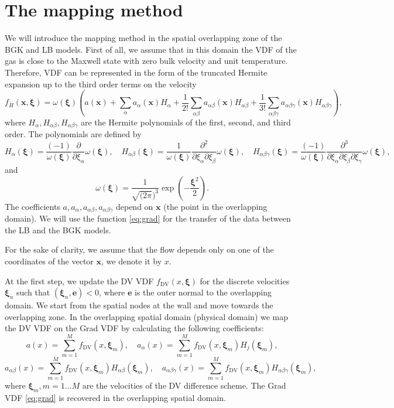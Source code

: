 \documentclass[]{elsarticle} %
\newcommand{\bxi}{\boldsymbol{\xi}}
\newcommand{\bx}{\boldsymbol{x}}
\newcommand{\DV}{\mathrm{DV}}
\newcommand{\ai}{a_{\alpha}}
\newcommand{\aij}{a_{\alpha\beta}}
\newcommand{\aijk}{a_{\alpha\beta\gamma}}
\newcommand{\Hi}{H_{\alpha}}
\newcommand{\Hij}{H_{\alpha\beta}}
\newcommand{\Hijk}{H_{\alpha\beta\gamma}}
\begin{document}

\section{The mapping method}\label{sec:mapping}

We will introduce the mapping method in the spatial overlapping zone of the BGK and LB models.
First of all, we assume that in this domain the VDF of the gas is close to the Maxwell state with zero bulk velocity and unit temperature.
Therefore, VDF can be represented in the form of the truncated Hermite expansion up to the third order terms on the velocity
\begin{equation}\label{eq:grad}
    f_H(\bx,\bxi) = \omega(\bxi)\left(a(\bx) +\sum_{\alpha}\ai(\bx)\Hi+\frac{1}{2!}\sum_{\alpha\beta}
    \aij(\bx)\Hij+\frac{1}{3!}\sum_{\alpha\beta \gamma}\aijk(\bx)\Hijk\right),
\end{equation}
where $\Hi, \Hij, \Hijk$ are the Hermite polynomials of the first, second, and third order. The polynomials are defined by
$$
H_\alpha(\bxi)=\frac{(-1)}{\omega(\bxi)}\frac{\partial}{\partial \xi_\alpha}\omega(\bxi),  \quad \Hij(\bxi)=\frac{1}{\omega(\bxi)}\frac{\partial^2}{\partial \xi_\alpha\partial \xi_\beta}\omega(\bxi),
\quad \Hijk(\bxi)=\frac{(-1)}{\omega(\bxi)}
\frac{\partial^3}{\partial \xi_\alpha\partial \xi_\beta \partial \xi_\gamma}\omega(\bxi),
$$
and
$$
 \omega(\bxi)= \frac{1}{\sqrt{(2\pi})^3}\exp\left(-\frac{\bxi^2}{2}\right).
$$
 The coefficients $a, \ai,\aij, \aijk$ depend on $\bx$ (the point in the overlapping domain).
 We will use the function \eqref{eq:grad} for the transfer of the data between the LB and the BGK models.

For the sake of clarity, we assume that the flow depends only on one of the coordinates of the vector $\bx$, we denote it by $x$.

At the first step, we update the DV VDF $f_\DV(x,\bxi)$ for the discrete velocities $\bxi_n$ such that $(\bxi_n,\mathbf{e})<0$,
where $\mathbf{e}$ is the outer normal to the overlapping domain.
We start from the  spatial nodes at the wall and move towards  the overlapping zone.
In the overlapping spatial domain (physical domain)  we map the DV VDF  on the Grad VDF by calculating the following coefficients:
$$
    a(x)=\sum_{m=1}^M f_\DV(x,\bxi_m), \quad \ai(x)=\sum_{m=1}^Mf_\DV(x,\bxi_m)H_j(\bxi_m),
$$
$$
    \aij(x)=\sum_{m=1}^Mf_\DV(x,\bxi_m)\Hij(\bxi_m), \quad
    \aijk(x)=\sum_{m=1}^Mf_\DV(x,\bxi_m)\Hijk(\bxi_m),
$$
where $\bxi_m, m=1 \ldots M$ are the velocities of the DV difference scheme.
The Grad VDF \eqref{eq:grad} is recovered in the overlapping spatial domain.
\end{document}
